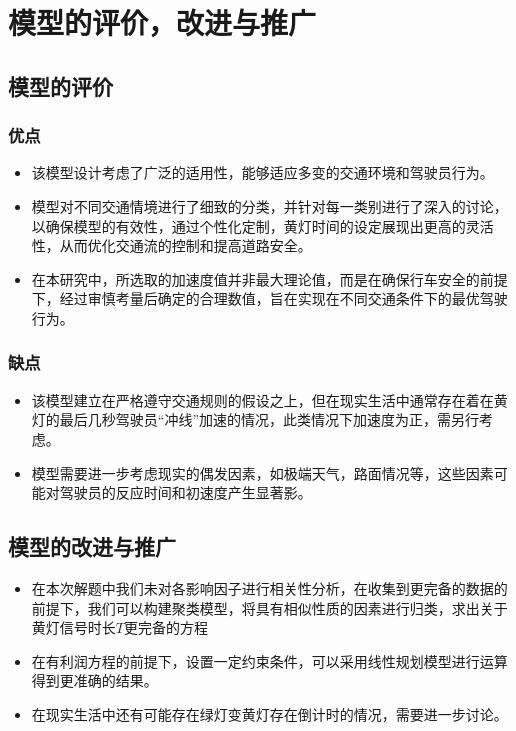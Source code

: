 \documentclass[withoutpreface,bwprint]{cumcmthesis}
\begin{document}
\section{模型的评价，改进与推广}
\subsection{模型的评价}
\subsubsection{优点}
\begin{itemize}
	\item 该模型设计考虑了广泛的适用性，能够适应多变的交通环境和驾驶员行为。
	\item 模型对不同交通情境进行了细致的分类，并针对每一类别进行了深入的讨论，以确保模型的有效性，通过个性化定制，黄灯时间的设定展现出更高的灵活性，从而优化交通流的控制和提高道路安全。
	\item 在本研究中，所选取的加速度值并非最大理论值，而是在确保行车安全的前提下，经过审慎考量后确定的合理数值，旨在实现在不同交通条件下的最优驾驶行为。
\end{itemize}
\subsubsection{缺点}
\begin{itemize}
	\item 该模型建立在严格遵守交通规则的假设之上，但在现实生活中通常存在着在黄灯的最后几秒驾驶员“冲线”加速的情况，此类情况下加速度为正，需另行考虑。
	\item 模型需要进一步考虑现实的偶发因素，如极端天气，路面情况\cite{ref3}等，这些因素可能对驾驶员的反应时间和初速度产生显著影。
\end{itemize}
\subsection{模型的改进与推广}
\begin{itemize}
	\item 在本次解题中我们未对各影响因子进行相关性分析，在收集到更完备的数据的前提下，我们可以构建聚类模型，将具有相似性质的因素进行归类，求出关于黄灯信号时长$T$更完备的方程
	\item 在有利润方程的前提下，设置一定约束条件，可以采用线性规划模型进行运算得到更准确的结果。
	\item 在现实生活中还有可能存在绿灯变黄灯存在倒计时的情况，需要进一步讨论。
	\end{itemize}
\end{document}
